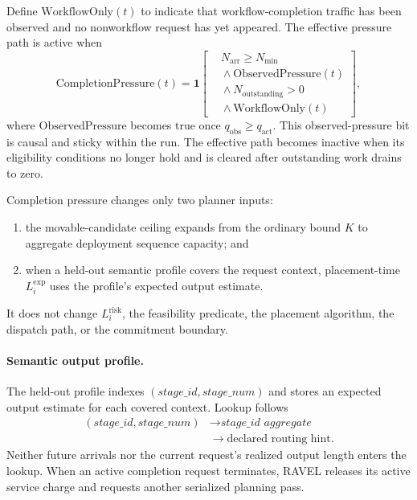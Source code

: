 Define $\mathrm{WorkflowOnly}(t)$ to indicate that workflow-completion traffic
has been observed and no nonworkflow request has yet appeared.
The effective pressure path is active when
\begin{equation}
\mathrm{CompletionPressure}(t)
=
\mathbf{1}\!\left[
\begin{aligned}
    &N_{\mathrm{arr}} \ge N_{\min} \\
    &{}\land \mathrm{ObservedPressure}(t) \\
    &{}\land N_{\mathrm{outstanding}} > 0 \\
    &{}\land \mathrm{WorkflowOnly}(t)
\end{aligned}
\right],
\label{eq:appendix:completion-pressure}
\end{equation}
where $\mathrm{ObservedPressure}$ becomes true once
$q_{\mathrm{obs}}\ge q_{\mathrm{act}}$.
This observed-pressure bit is causal and sticky within the run.
The effective path becomes inactive when its eligibility conditions no longer
hold and is cleared after outstanding work drains to zero.

Completion pressure changes only two planner inputs:
\begin{enumerate}
    \item the movable-candidate ceiling expands from the ordinary bound $K$ to
          aggregate deployment sequence capacity; and
    \item when a held-out semantic profile covers the request context,
          placement-time $L_i^{\mathrm{exp}}$ uses the profile's expected
          output estimate.
\end{enumerate}
It does not change $L_i^{\mathrm{risk}}$, the feasibility predicate, the
placement algorithm, the dispatch path, or the commitment boundary.

\paragraph{Semantic output profile.}
The held-out profile indexes
$(\textit{stage\_id},\textit{stage\_num})$ and stores an expected output
estimate for each covered context.
Lookup follows
\begin{equation}
\begin{aligned}
(\textit{stage\_id},\textit{stage\_num})
   &\rightarrow
   \textit{stage\_id aggregate}\\
   &\rightarrow
   \text{declared routing hint}.
\end{aligned}
\label{eq:appendix:output-profile-fallback}
\end{equation}
Neither future arrivals nor the current request's realized output length
enters the lookup.
When an active completion request terminates, RAVEL releases its active
service charge and requests another serialized planning pass.


